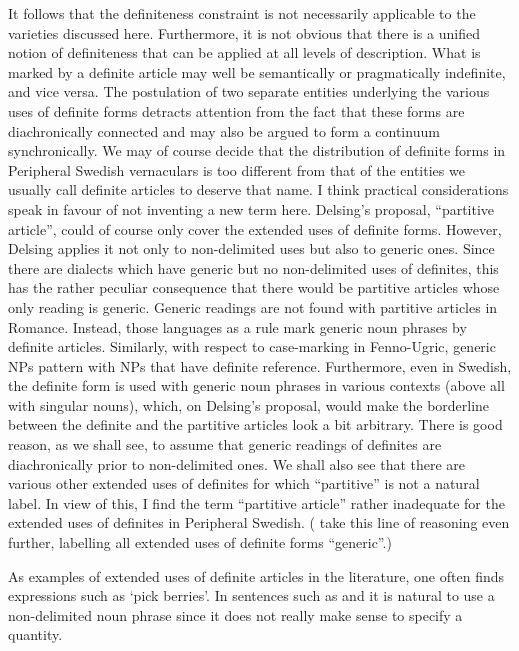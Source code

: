 It follows that the definiteness constraint is not necessarily applicable to the varieties discussed here. Furthermore, it is not obvious that there is a unified notion of definiteness that can be applied at all levels of description. What is marked by a definite article may well be semantically or pragmatically indefinite, and vice versa. The postulation of two separate entities underlying the various uses of definite forms detracts attention from the fact that these forms are diachronically connected and may also be argued to form a continuum synchronically. We may of course decide that the distribution of definite forms in Peripheral Swedish vernaculars is too different from that of the entities we usually call definite articles to deserve that name. I think practical considerations speak in favour of not inventing a new term here. Delsing’s proposal, “partitive article”, could of course only cover the extended uses of definite forms. However, Delsing applies it not only to non-delimited uses but also to generic ones. Since there are dialects which have generic but no non-delimited uses of definites, this has the rather peculiar consequence that there would be partitive articles whose only reading is generic. Generic readings are not found with partitive articles in Romance. Instead, those languages as a rule mark generic noun phrases by definite articles. Similarly, with respect to case-marking in Fenno-Ugric, generic NPs pattern with NPs that have definite reference. Furthermore, even in Swedish, the definite form is used with generic noun phrases in various contexts (above all with singular nouns), which, on Delsing’s proposal, would make the borderline between the definite and the partitive articles look a bit arbitrary. There is good reason, as we shall see, to assume that generic readings of definites are diachronically prior to non-delimited ones. We shall also see that there are various other extended uses of definites for which “partitive” is not a natural label. In view of this, I find the term “partitive article” rather inadequate for the extended uses of definites in Peripheral Swedish. (\citet{BergholmEtAl1999} take this line of reasoning even further, labelling all extended uses of definite forms “generic”.)

As examples of extended uses of definite articles in the literature, one often finds expressions such as ‘pick berries’. In sentences such as  and  it is natural to use a non-delimited noun phrase since it does not really make sense to specify a quantity. 

